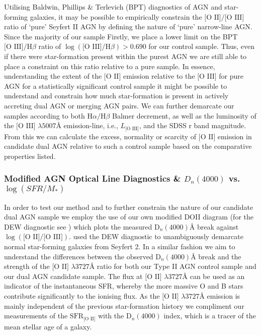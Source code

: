 Utilising Baldwin, Phillips \& Terlevich (BPT) diagnostics of AGN and star-forming galaxies, it may be possible to empirically constrain the $\text{[O II]}/\text{[O III]}$ ratio of `pure' Seyfert II AGN by defining the nature of `pure' narrow-line AGN. Since the majority of our sample Firstly, we place a lower limit on the BPT $\text{[O III]}/\text{H}\beta$ ratio of $\log(\text{[O III]}/\text{H}\beta)>{0.690}$ for our control sample. Thus, even if there were star-formation present within the purest AGN we are still able to place a constraint on this ratio relative to a pure sample. In essence, understanding the extent of the $\text{[O II]}$ emission relative to the $\text{[O III]}$ for pure AGN for a statistically significant control sample it might be possible to understand and constrain how much star-formation is present in actively accreting dual AGN or merging AGN pairs. We can further demarcate our samples according to both $\text{H}\alpha/\text{H}\beta$ Balmer decrement, as well as the luminosity of the $\text{[O III]}$ $\lambda{5007}Å$ emission-line, i.e., $L_{\text{[O III]}}$, and the SDSS r band magnitude. From this we can calculate the excess, normality or scarcity of $\text{[O II]}$ emission in candidate dual AGN relative to such a control sample based on the comparative properties listed.

\subsubsection{Modified AGN Optical Line Diagnostics \& $D_{n}(4000)$ vs. $\log(SFR/M_{*})$}

In order to test our method and to further constrain the nature of our candidate dual AGN sample we employ the use of our own modified DOII diagram (for the DEW diagnostic see \cite{Stasinska_2006}) which plots the measured $\text{D}_{n}(4000)Å$ break against $\log(\text{[O II]}/\text{[O III]})$. \cite{Marocco_2011} used the DEW diagnostic to unambiguously demarcate normal star-forming galaxies from Seyfert 2. In a similar fashion we aim to understand the differences between the observed $\text{D}_{n}(4000)Å$ break and the strength of the $\text{[O II]}$ $\lambda{3727}Å$ ratio for both our Type II AGN control sample and our dual AGN candidate sample. The flux at $\text{[O II]}$ $\lambda{3727}Å$ can be used as an indicator of the instantaneous SFR, whereby the more massive O and B stars contribute significantly to the ionising flux. As the $\text{[O II]}$ $\lambda{3727}Å$ emission is mainly independent of the previous star-formation history we compliment our measurements of the $\text{SFR}_{\text{[O II]}}$ with the $\text{D}_{n}(4000)$ index, which is a tracer of the mean stellar age of a galaxy.